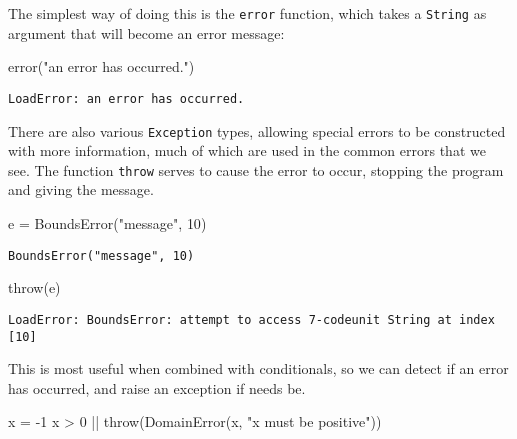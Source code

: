 \documentclass[
  letterpaper,
  DIV=11,
  numbers=noendperiod]{scrreprt}
\newenvironment{Shaded}{\begin{snugshade}}{\end{snugshade}}
\newcommand{\ConstantTok}[1]{\textcolor[rgb]{0.56,0.35,0.01}{#1}}
\newcommand{\FloatTok}[1]{\textcolor[rgb]{0.68,0.00,0.00}{#1}}
\newcommand{\FunctionTok}[1]{\textcolor[rgb]{0.28,0.35,0.67}{#1}}
\newcommand{\NormalTok}[1]{\textcolor[rgb]{0.00,0.23,0.31}{#1}}
\newcommand{\OperatorTok}[1]{\textcolor[rgb]{0.37,0.37,0.37}{#1}}
\newcommand{\StringTok}[1]{\textcolor[rgb]{0.13,0.47,0.30}{#1}}
\begin{document}
The simplest way of doing this is the \texttt{error} function, which
takes a \texttt{String} as argument that will become an error message:

\begin{Shaded}
\begin{Highlighting}[]
\FunctionTok{error}\NormalTok{(}\StringTok{"an error has occurred."}\NormalTok{)}
\end{Highlighting}
\end{Shaded}

\begin{verbatim}
LoadError: an error has occurred.
\end{verbatim}

There are also various \texttt{Exception} types, allowing special errors
to be constructed with more information, much of which are used in the
common errors that we see. The function \texttt{throw} serves to cause
the error to occur, stopping the program and giving the message.

\begin{Shaded}
\begin{Highlighting}[]
\ConstantTok{e} \OperatorTok{=} \FunctionTok{BoundsError}\NormalTok{(}\StringTok{"message"}\NormalTok{, }\FloatTok{10}\NormalTok{)}
\end{Highlighting}
\end{Shaded}

\begin{verbatim}
BoundsError("message", 10)
\end{verbatim}

\begin{Shaded}
\begin{Highlighting}[]
\FunctionTok{throw}\NormalTok{(}\ConstantTok{e}\NormalTok{)}
\end{Highlighting}
\end{Shaded}

\begin{verbatim}
LoadError: BoundsError: attempt to access 7-codeunit String at index [10]
\end{verbatim}

This is most useful when combined with conditionals, so we can detect if
an error has occurred, and raise an exception if needs be.

\begin{Shaded}
\begin{Highlighting}[]
\NormalTok{x }\OperatorTok{=} \OperatorTok{{-}}\FloatTok{1}
\NormalTok{x }\OperatorTok{\textgreater{}} \FloatTok{0} \OperatorTok{||} \FunctionTok{throw}\NormalTok{(}\FunctionTok{DomainError}\NormalTok{(x, }\StringTok{"x must be positive"}\NormalTok{))}
\end{Highlighting}
\end{Shaded}
\end{document}

